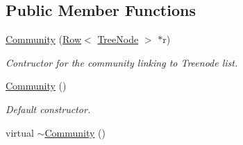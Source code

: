 \subsection*{Public Member Functions}
\begin{DoxyCompactItemize}
\item 
\hyperlink{class_community_a7697e887d12366a6953fe7439d978768}{Community} (\hyperlink{class_row}{Row}$<$ \hyperlink{class_tree_node}{Tree\+Node} $>$ $\ast$r)
\begin{DoxyCompactList}\small\item\em Contructor for the community linking to Treenode list. \end{DoxyCompactList}\item 
\hyperlink{class_community_a995bd6adbfb7a4aad1bc5fb74e2a8ef2}{Community} ()\hypertarget{class_community_a995bd6adbfb7a4aad1bc5fb74e2a8ef2}{}\label{class_community_a995bd6adbfb7a4aad1bc5fb74e2a8ef2}

\begin{DoxyCompactList}\small\item\em Default constructor. \end{DoxyCompactList}\item 
virtual \hyperlink{class_community_ac20910659d928af0dc4f7027bfece25c}{$\sim$\+Community} ()\hypertarget{class_community_ac20910659d928af0dc4f7027bfece25c}{}\label{class_community_ac20910659d928af0dc4f7027bfece25c}


\end{DoxyCompactItemize}
